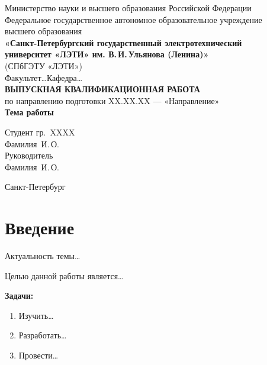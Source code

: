\documentclass[12pt, a4paper]{article}
\begin{document}
\begin{titlepage}
  \centering
  {\small Министерство науки и высшего образования Российской Федерации}\\[0.3cm]
  {\small Федеральное государственное автономное образовательное учреждение\\высшего образования}\\[0.3cm]
  {\small\textbf{«Санкт-Петербургский государственный электротехнический\\университет «ЛЭТИ» им. В.\,И.\,Ульянова (Ленина)»}}\\[0.3cm]
  {\small (СПбГЭТУ «ЛЭТИ»)}\\[0.5cm]
  {\small Факультет\ldots \quad Кафедра\ldots}\\[2cm]

  {\Large\textbf{ВЫПУСКНАЯ КВАЛИФИКАЦИОННАЯ РАБОТА}}\\[0.5cm]
  {\large по направлению подготовки XX.XX.XX --- «Направление»}\\[0.5cm]
  {\large\textbf{Тема работы}}\\[2cm]

  \begin{flushleft}
    \hspace{8cm} Студент гр.\ XXXX \\
    \hspace{8cm} \underline{\hspace{3cm}} Фамилия~И.\,О. \\[0.5cm]
    \hspace{8cm} Руководитель \\
    \hspace{8cm} \underline{\hspace{3cm}} Фамилия~И.\,О. \\[0.5cm]
  \end{flushleft}
  \vfill
  {\small Санкт-Петербург \\ \the\year}
\end{titlepage}

\newpage
\tableofcontents
\newpage

\section*{Введение}

Актуальность темы\ldots

Целью данной работы является\ldots

\textbf{Задачи:}
\begin{enumerate}
  \item Изучить\ldots
  \item Разработать\ldots
  \item Провести\ldots
\end{enumerate}
\end{document}
